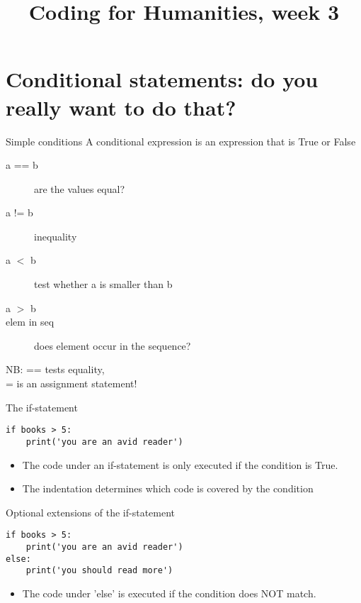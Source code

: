 \documentclass[aspectratio=169,usenames,dvipsnames]{beamer}
\title{Coding for Humanities, week 3}
\begin{document}
\begin{frame}
 \titlepage
\end{frame}

\begin{frame}
 \tableofcontents
\end{frame}

\frame{\tableofcontents[currentsection]}
\section{Conditional statements: do you really want to do that?}
\begin{frame}{Simple conditions}
    A conditional expression is
    an expression that is True or False
    \begin{description}
        \item[a == b] are the values equal?
        \item[a != b] inequality
        \item[a $<$ b] test whether a is smaller than b
        \item[a $>$ b]
        \item[elem in seq] does element occur in the sequence?
    \end{description}

    NB: == tests equality, \\
        = is an assignment statement!
\end{frame}

\begin{frame}[fragile]{The if-statement}
\begin{lstlisting}
if books > 5:
    print('you are an avid reader')
\end{lstlisting}

\begin{itemize}
    \item The code under an if-statement is only executed
        if the condition is True.
    \item The indentation determines which code is covered
        by the condition
\end{itemize}
\end{frame}


\begin{frame}[fragile]{Optional extensions of the if-statement}
\begin{lstlisting}
if books > 5:
    print('you are an avid reader')
else:
    print('you should read more')
\end{lstlisting}

\begin{itemize}
    \item The code under 'else' is executed if the condition does NOT match.
\end{itemize}
\end{frame}
\end{document}
